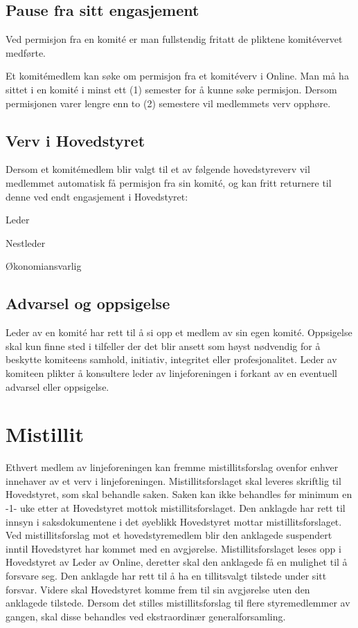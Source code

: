 \subsection{Pause fra sitt engasjement}{
Ved permisjon fra en komité er man fullstendig fritatt de pliktene komitévervet medførte.

Et komitémedlem kan søke om permisjon fra et komitéverv i Online. Man må ha sittet i en komité i minst ett (1) semester for å kunne søke permisjon. Dersom permisjonen varer lengre enn to (2) semestere vil medlemmets verv opphøre.
}

\subsection{Verv i Hovedstyret}{
Dersom et komitémedlem blir valgt til et av følgende hovedstyreverv vil medlemmet automatisk få permisjon fra sin komité, og kan fritt \linebreak returnere til denne ved endt engasjement i Hovedstyret:
\begin{liste}
	\item Leder
	\item Nestleder
	\item Økonomiansvarlig
\end{liste}
}

\subsection{Advarsel og oppsigelse}{
Leder av en komité har rett til å si opp et medlem av sin egen komité. Oppsigelse skal kun finne sted i tilfeller der det blir ansett som høyst nødvendig for å beskytte komiteens samhold, initiativ, integritet eller profesjonalitet. Leder av komiteen plikter å konsultere leder av linjeforeningen i forkant av en eventuell advarsel eller oppsigelse.
}

\section{Mistillit}
\vspace{23pt}

Ethvert medlem av linjeforeningen kan fremme mistillitsforslag ovenfor enhver innehaver av et verv i linjeforeningen. Mistillitsforslaget skal leveres skriftlig til Hovedstyret, som skal behandle saken. Saken kan ikke behandles før minimum en -1- uke etter at Hovedstyret mottok mistillitsforslaget. Den anklagde har rett til innsyn i saksdokumentene i det øyeblikk Hovedstyret mottar mistillitsforslaget. Ved mistillitsforslag mot et hovedstyremedlem blir den anklagede suspendert inntil Hovedstyret har kommet med en avgjørelse. Mistillitsforslaget leses opp i Hovedstyret av Leder av Online, deretter skal den anklagede få en mulighet til å forsvare seg. Den anklagde har rett til å ha en tillitsvalgt tilstede under sitt forsvar. Videre skal Hovedstyret komme frem til sin avgjørelse uten den anklagede tilstede. Dersom det stilles mistillitsforslag til flere styremedlemmer av gangen, skal disse behandles ved ekstraordinær generalforsamling.


